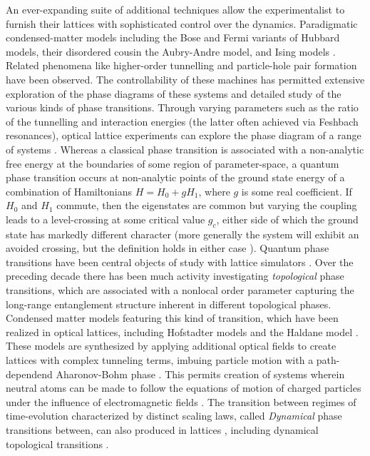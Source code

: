 	An ever-expanding suite of additional techniques allow the experimentalist to furnish their lattices with sophisticated control over the dynamics.
	Paradigmatic condensed-matter models including the Bose \cite{Greiner01,Miranda15,Rispoli19,Sherson10,Preiss15a} and Fermi \cite{Bakr09,Cheuk15,Haller15,Chiu18} variants of Hubbard models, their disordered cousin the Aubry-Andre \cite{Rispoli19} model, and Ising models \cite{Simon11}.
	Related phenomena like higher-order tunnelling \cite{Folling07} and particle-hole pair formation \cite{Endres11} have been observed.
	The controllability of these machines has permitted extensive exploration of the phase diagrams of these systems and detailed study of the various kinds of phase transitions.
	Through varying parameters such as the ratio of the tunnelling and interaction energies (the latter often achieved via Feshbach resonances), optical lattice experiments can explore the phase diagram of a range of systems \cite{Greiner01,Eckardt05,Jordens08,Jo09,Haller10,Simon11,Baumann10,Leonard17,Landig16,SachdevQPT,Endres12,Anquez16,Clark16}.
	Whereas a classical phase transition is associated with a non-analytic free energy at the boundaries of some region of parameter-space, a quantum phase transition occurs at non-analytic points of the ground state energy of a combination of Hamiltonians $H = H_0 + g H_1$, where $g$ is some real coefficient.
	\cite{SachdevQPT}
	If $H_0$ and $H_1$ commute, then the eigenstates are common but varying the coupling leads to a level-crossing at some critical value $g_c$, either side of which the ground state has markedly different character (more generally the system will exhibit an avoided crossing, but the definition holds in either case \cite{SachdevQPT}).
	Quantum phase transitions have been central objects of study with lattice simulators \cite{Greiner01,Eckardt05,Jordens08,Baumann10,Endres12,Haller10,Leonard17,Landig16,SachdevQPT}.
	Over the preceding decade there has been much activity investigating \emph{topological} phase transitions, which are associated with a nonlocal order parameter capturing the long-range entanglement structure inherent in different topological phases\cite{Goldman16,Nakagawa14}.
	Condensed matter models featuring this kind of transition, which have been realized in optical lattices, including Hofstadter models\cite{Aidelsburger13,Tai17,Miyake13} and the Haldane model \cite{Jotzu14}.
	These models are synthesized by applying additional optical fields to create lattices with complex tunneling terms, imbuing particle motion with a path-dependend Aharonov-Bohm phase \cite{Aidelsburger11,Aidelsburger13,Miyake13}.
	This permits creation of systems wherein neutral atoms can be made to follow the equations of motion of charged particles under the influence of electromagnetic fields \cite{Aidelsburger13,Tai17,Endres11,Rispoli19,Jo09,Simon11,Miyake13,Folling07,Jotzu14}.
	The transition between regimes of time-evolution characterized by distinct scaling laws, called \emph{Dynamical} phase transitions between, can also produced in lattices \cite{Clark16}, including dynamical topological transitions \cite{Nakagawa14}.
	

